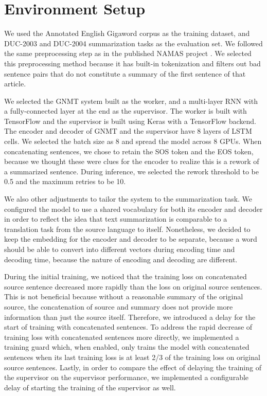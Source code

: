 \documentclass[letterpaper]{article} %
\begin{document}
\section{Environment Setup}
We used the Annotated English Gigaword corpus \cite{napoles2012annotated} as the training dataset, and DUC-2003 and DUC-2004 summarization tasks \cite{over2007duc} as the evaluation set. We followed the same preprocessing step as in the published NAMAS project \cite{rush2015neural}. We selected this preprocessing method because it has built-in tokenization and filters out bad sentence pairs that do not constitute a summary of the first sentence of that article.

We selected the GNMT system built as the worker, and a multi-layer RNN with a fully-connected layer at the end as the supervisor. The worker is built with TensorFlow and the supervisor is built using Keras with a TensorFlow backend. The encoder and decoder of GNMT and the supervisor have 8 layers of LSTM cells. We selected the batch size as 8 and spread the model across 8 GPUs. When concatenating sentences, we chose to retain the SOS token and the EOS token, because we thought these were clues for the encoder to realize this is a rework of a summarized sentence. During inference, we selected the rework threshold to be 0.5 and the maximum retries to be 10.

We also other adjustments to tailor the system to the summarization task. We configured the model to use a shared vocabulary for both its encoder and decoder in order to reflect the idea that text summarization is comparable to a translation task from the source language to itself. Nonetheless, we decided to keep the embedding for the encoder and decoder to be separate, because a word should be able to convert into different vectors during encoding time and decoding time, because the nature of encoding and decoding are different.

During the initial training, we noticed that the training loss on concatenated source sentence decreased more rapidly than the loss on original source sentences. This is not beneficial because without a reasonable summary of the original source, the concatenation of source and summary does not provide more information than just the source itself. Therefore, we introduced a delay for the start of training with concatenated sentences. To address the rapid decrease of training loss with concatenated sentences more directly, we implemented a training guard which, when enabled, only trains the model with concatenated sentences when its last training loss is at least 2/3 of the training loss on original source sentences. Lastly, in order to compare the effect of delaying the training of the supervisor on the supervisor performance, we implemented a configurable delay of starting the training of the supervisor as well.
\end{document}
